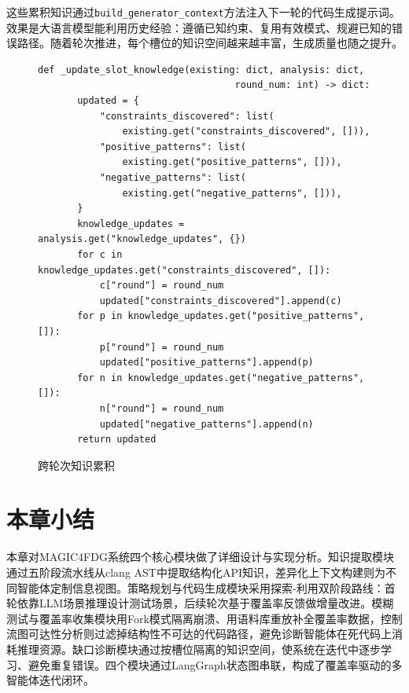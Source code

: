 这些累积知识通过\texttt{build\_generator\_context}方法注入下一轮的代码生成提示词。效果是大语言模型能利用历史经验：遵循已知约束、复用有效模式、规避已知的错误路径。随着轮次推进，每个槽位的知识空间越来越丰富，生成质量也随之提升。

\begin{figure}[H]
    \centering
    \begin{lstlisting}[style=style@python]
   def _update_slot_knowledge(existing: dict, analysis: dict,
                                   round_num: int) -> dict:
       updated = {
           "constraints_discovered": list(
               existing.get("constraints_discovered", [])),
           "positive_patterns": list(
               existing.get("positive_patterns", [])),
           "negative_patterns": list(
               existing.get("negative_patterns", [])),
       }
       knowledge_updates = analysis.get("knowledge_updates", {})
       for c in knowledge_updates.get("constraints_discovered", []):
           c["round"] = round_num
           updated["constraints_discovered"].append(c)
       for p in knowledge_updates.get("positive_patterns", []):
           p["round"] = round_num
           updated["positive_patterns"].append(p)
       for n in knowledge_updates.get("negative_patterns", []):
           n["round"] = round_num
           updated["negative_patterns"].append(n)
       return updated
    \end{lstlisting}
    \caption{跨轮次知识累积}
    \label{fig:update-knowledge}
\end{figure}

\section{本章小结}

本章对MAGIC4FDG系统四个核心模块做了详细设计与实现分析。知识提取模块通过五阶段流水线从clang AST中提取结构化API知识，差异化上下文构建则为不同智能体定制信息视图。策略规划与代码生成模块采用探索-利用双阶段路线：首轮依靠LLM场景推理设计测试场景，后续轮次基于覆盖率反馈做增量改进。模糊测试与覆盖率收集模块用Fork模式隔离崩溃、用语料库重放补全覆盖率数据，控制流图可达性分析则过滤掉结构性不可达的代码路径，避免诊断智能体在死代码上消耗推理资源。缺口诊断模块通过按槽位隔离的知识空间，使系统在迭代中逐步学习、避免重复错误。四个模块通过LangGraph状态图串联，构成了覆盖率驱动的多智能体迭代闭环。
